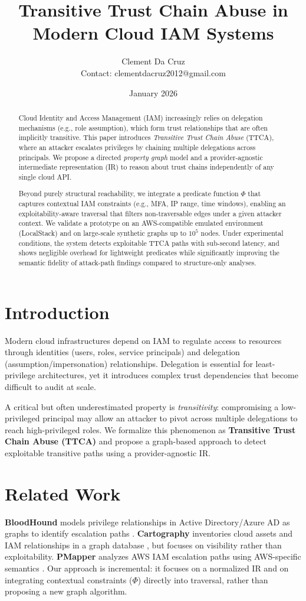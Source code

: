 \documentclass[a4paper,11pt]{article}
\title{\textbf{Transitive Trust Chain Abuse in Modern Cloud IAM Systems}}
\author{Clement Da Cruz \\ \small Contact: clementdacruz2012@gmail.com}
\date{January 2026}
\begin{document}
\maketitle

\begin{abstract}
Cloud Identity and Access Management (IAM) increasingly relies on delegation mechanisms (e.g., role assumption), which form trust relationships that are often implicitly transitive. This paper introduces \textit{Transitive Trust Chain Abuse} (TTCA), where an attacker escalates privileges by chaining multiple delegations across principals. We propose a directed \textit{property graph} model and a provider-agnostic intermediate representation (IR) to reason about trust chains independently of any single cloud API.

Beyond purely structural reachability, we integrate a predicate function $\Phi$ that captures contextual IAM constraints (e.g., MFA, IP range, time windows), enabling an exploitability-aware traversal that filters non-traversable edges under a given attacker context. We validate a prototype on an AWS-compatible emulated environment (LocalStack) and on large-scale synthetic graphs up to $10^5$ nodes. Under experimental conditions, the system detects exploitable TTCA paths with sub-second latency, and shows negligible overhead for lightweight predicates while significantly improving the semantic fidelity of attack-path findings compared to structure-only analyses.
\end{abstract}

\section{Introduction}
Modern cloud infrastructures depend on IAM to regulate access to resources through identities (users, roles, service principals) and delegation (assumption/impersonation) relationships. Delegation is essential for least-privilege architectures, yet it introduces complex trust dependencies that become difficult to audit at scale.

A critical but often underestimated property is \textit{transitivity}: compromising a low-privileged principal may allow an attacker to pivot across multiple delegations to reach high-privileged roles. We formalize this phenomenon as \textbf{Transitive Trust Chain Abuse (TTCA)} and propose a graph-based approach to detect exploitable transitive paths using a provider-agnostic IR.

\section{Related Work}
\textbf{BloodHound} models privilege relationships in Active Directory/Azure AD as graphs to identify escalation paths \cite{bloodhound}. \textbf{Cartography} inventories cloud assets and IAM relationships in a graph database \cite{cartography}, but focuses on visibility rather than exploitability. \textbf{PMapper} analyzes AWS IAM escalation paths using AWS-specific semantics \cite{pmapper}. Our approach is incremental: it focuses on a normalized IR and on integrating contextual constraints (\(\Phi\)) directly into traversal, rather than proposing a new graph algorithm.
\end{document}
